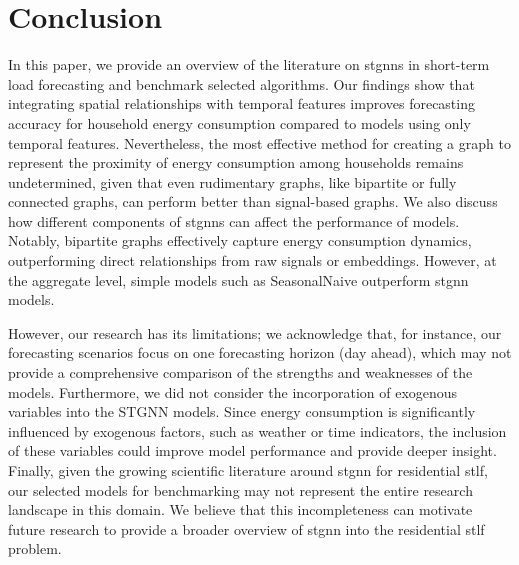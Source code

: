 \section{Conclusion}\label{sec:conclusion}

In this paper, we provide an overview of the literature on \glspl{stgnn} in short-term load forecasting and benchmark selected algorithms. Our findings show that integrating spatial relationships with temporal features improves forecasting accuracy for household energy consumption compared to models using only temporal features. Nevertheless, the most effective method for creating a graph to represent the proximity of energy consumption among households remains undetermined, given that even rudimentary graphs, like bipartite or fully connected graphs, can perform better than signal-based graphs. We also discuss how different components of \glspl{stgnn} can affect the performance of models. Notably, bipartite graphs effectively capture energy consumption dynamics, outperforming direct relationships from raw signals or embeddings. However, at the aggregate level, simple models such as SeasonalNaive outperform \gls{stgnn} models.


However, our research has its limitations; we acknowledge that, for instance, our forecasting scenarios focus on one forecasting horizon (day ahead), which may not provide a comprehensive comparison of the strengths and weaknesses of the models. Furthermore, we did not consider the incorporation of exogenous variables into the STGNN models. Since energy consumption is significantly influenced by exogenous factors, such as weather or time indicators, the inclusion of these variables could improve model performance and provide deeper insight. Finally, given the growing scientific literature around \acrshort{stgnn} for residential \acrshort{stlf}, our selected models for benchmarking may not represent the entire research landscape in this domain. We believe that this incompleteness can motivate future research to provide a broader overview of \acrshort{stgnn} into the residential \acrshort{stlf} problem.

